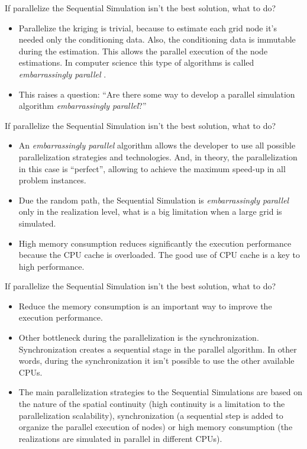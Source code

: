 \begin{frame}{If parallelize the Sequential Simulation isn't the best solution, what to do?}
	\begin {itemize}
		\item Parallelize the kriging is trivial, because to estimate each grid node it's needed only the conditioning data. Also, the conditioning data is immutable during the estimation. This allows the parallel execution of the node estimations. In computer science this type of algorithms is called \textit{embarrassingly parallel} \cite{wilkinson1999parallel}.
    
    	\item This raises a question: ``Are there some way to develop a parallel simulation algorithm \textit{embarrassingly parallel}?''
    \end {itemize}
\end{frame}

\begin{frame}{If parallelize the Sequential Simulation isn't the best solution, what to do?}
	\begin {itemize}
		\item An \textit{embarrassingly parallel} algorithm allows the developer to use all possible parallelization strategies and technologies. And, in theory, the parallelization in this case is ``perfect'', allowing to achieve the maximum speed-up in all problem instances. 
        \item Due the random path, the Sequential Simulation is \textit{embarrassingly parallel} only in the realization level, what is a big limitation when a large grid is simulated.
        \item High memory consumption reduces significantly the execution performance because the CPU cache is overloaded. The  good use of CPU cache is a key to high performance.
    \end {itemize}
\end{frame}


\begin{frame}{If parallelize the Sequential Simulation isn't the best solution, what to do?}
	\begin {itemize}
    	\item Reduce the memory consumption is an important way to improve the execution performance.
        \item Other bottleneck during the parallelization is the synchronization. Synchronization creates a sequential stage in the parallel algorithm. In other words, during the synchronization it isn't possible to use the other available CPUs.
        \item The main parallelization strategies to the Sequential Simulations are based on the nature of the spatial continuity (high continuity is a limitation to the parallelization scalability), synchronization (a sequential step is added to organize the parallel execution of nodes) or high memory consumption (the realizations are simulated in parallel in different CPUs).
    	
    \end {itemize}
\end{frame}


